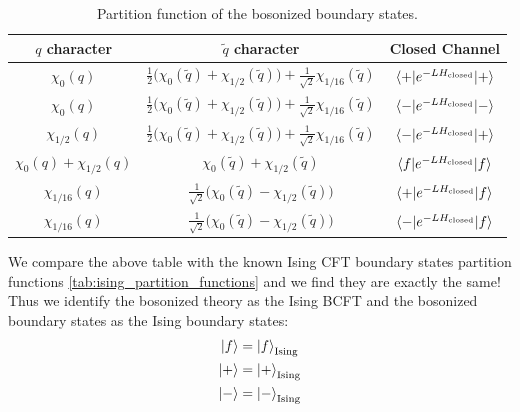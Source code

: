\begin{table}[H]
\centering
\renewcommand{\arraystretch}{1.6}
\begin{tabular}{ccc}
\hline\hline
$q$ character & $\tilde q$ character & Closed Channel \\
\hline\hline

$\chi_0(q) $
              & $ \frac{1}{2}\big(\chi_0(\tilde q) + \chi_{1/2}(\tilde q) \big) + \frac{1}{\sqrt{2}}\chi_{1/16}(\tilde q)$
& $\langle + | e^{-L H_{\rm closed}} | + \rangle$
\\
$\chi_0(q) $
              & $ \frac{1}{2}\big(\chi_0(\tilde q) + \chi_{1/2}(\tilde q) \big) + \frac{1}{\sqrt{2}}\chi_{1/16}(\tilde q)$
& $\langle - | e^{-L H_{\rm closed}} | - \rangle$
\\

$ \chi_{1/2}(q) $
&  $ \frac{1}{2}\big(\chi_0(\tilde q) + \chi_{1/2}(\tilde q) \big) + \frac{1}{\sqrt{2}}\chi_{1/16}(\tilde q)$
& $\langle - | e^{-L H_{\rm closed}} | + \rangle$
\\

$ \chi_0(q) + \chi_{1/2}(q) $
& $ \chi_0(\tilde{q}) + \chi_{1/2}(\tilde{q}) $
& $\langle f | e^{-L H_{\rm closed}} | f \rangle$
\\

$ \chi_{1/16}(q)$
& $\frac{1}{\sqrt{2}}\big(\chi_0(\tilde q) - \chi_{1/2}(\tilde q)\big)$
& $\langle + | e^{-L H_{\rm closed}} | f \rangle$
\\

$ \chi_{1/16}(q)$
& $\frac{1}{\sqrt{2}}\big(\chi_0(\tilde q) - \chi_{1/2}(\tilde q)\big)$
& $\langle - | e^{-L H_{\rm closed}} | f \rangle$
\\

\hline\hline
\end{tabular}
\caption{Partition function of the bosonized boundary states.}
\end{table}
We compare the above table with the known Ising CFT boundary states partition functions \cref{tab:ising_partition_functions} and we find they are exactly the same! Thus we identify the bosonized theory as the Ising BCFT and the bosonized boundary states as the Ising boundary states:
\begin{align}
  \ket{f} &= \ket{f}_{\text{Ising}} \\ 
  \ket{+} &= \ket{+}_{\text{Ising}} \\ 
  \ket{-} &= \ket{-}_{\text{Ising}}
\end{align}

